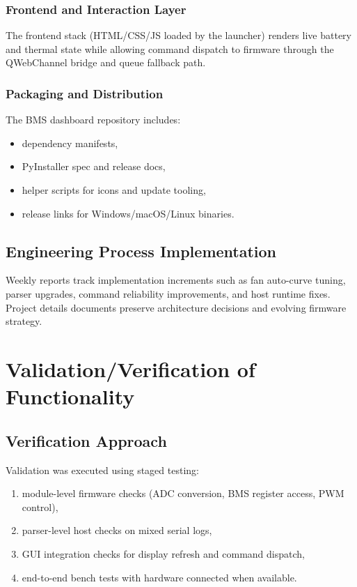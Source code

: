 \documentclass[12pt]{article}
\begin{document}
\subsubsection{Frontend and Interaction Layer}
The frontend stack (HTML/CSS/JS loaded by the launcher) renders live battery and thermal state while allowing command dispatch to firmware through the QWebChannel bridge and queue fallback path.

\subsubsection{Packaging and Distribution}
The BMS dashboard repository includes:
\begin{itemize}[leftmargin=1.2cm]
    \item dependency manifests,
    \item PyInstaller spec and release docs,
    \item helper scripts for icons and update tooling,
    \item release links for Windows/macOS/Linux binaries.
\end{itemize}

\subsection{Engineering Process Implementation}
Weekly reports track implementation increments such as fan auto-curve tuning, parser upgrades, command reliability improvements, and host runtime fixes. Project details documents preserve architecture decisions and evolving firmware strategy.

\section{Validation/Verification of Functionality}

\subsection{Verification Approach}
Validation was executed using staged testing:
\begin{enumerate}[leftmargin=1.2cm]
    \item module-level firmware checks (ADC conversion, BMS register access, PWM control),
    \item parser-level host checks on mixed serial logs,
    \item GUI integration checks for display refresh and command dispatch,
    \item end-to-end bench tests with hardware connected when available.
\end{enumerate}
\end{document}

